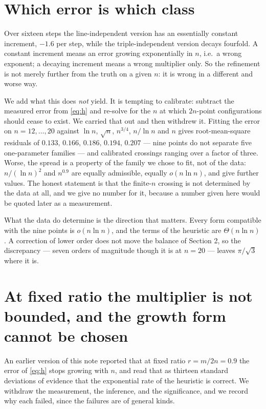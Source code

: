 \documentclass[11pt,a4paper]{article}
\begin{document}
\section{Which error is which class}
Over sixteen steps the line-independent version has an essentially constant increment,
$-1.6$ per step, while the triple-independent version decays fourfold.  A constant increment means
an error growing exponentially in $n$, i.e.\ a wrong exponent; a decaying increment means a wrong
multiplier only.  So the refinement is not merely further from the truth on a given $n$: it is
wrong in a different and worse way.

We add what this does \emph{not} yield.  It is tempting to calibrate: subtract the measured error
from \eqref{eq:h} and re-solve for the $n$ at which $2n$-point configurations should cease to
exist.  We carried that out and then withdrew it.  Fitting the error on $n=12,\dots,20$ against
$\ln n$, $\sqrt n$, $n^{3/4}$, $n/\ln n$ and $n$ gives root-mean-square residuals of
$0.133,\,0.166,\,0.186,\,0.194,\,0.207$ --- nine points do not separate five one-parameter
families --- and calibrated crossings ranging over a factor of three.  Worse, the spread is a
property of the family we chose to fit, not of the data: $n/(\ln n)^2$ and $n^{0.9}$ are equally
admissible, equally $o(n\ln n)$, and give further values.  The honest statement is that the
finite-$n$ crossing is not determined by the data at all, and we give no number for it, because a
number given here would be quoted later as a measurement.

What the data do determine is the direction that matters.  Every form compatible with the nine
points is $o(n\ln n)$, and the terms of the heuristic are $\Theta(n\ln n)$.  A correction of lower
order does not move the balance of Section 2, so the discrepancy --- seven orders of magnitude
though it is at $n=20$ --- leaves $\pi/\sqrt3$ where it is.


\section{At fixed ratio the multiplier is not bounded, and the growth form cannot be chosen}
An earlier version of this note reported that at fixed ratio $r=m/2n=0.9$ the error of
\eqref{eq:h} stops growing with $n$, and read that as thirteen standard deviations of evidence
that the exponential rate of the heuristic is correct.  We withdraw the measurement, the
inference, and the significance, and we record why each failed, since the failures are of
general kinds.
\end{document}
